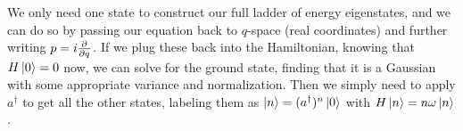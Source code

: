 We only need one state to construct our full ladder of energy eigenstates, and we can do so by passing our equation back to $q$-space (real coordinates) and further writing $p=i \P{}{q}$. If we plug these back into the Hamiltonian, knowing that $H\ket{0}=0$ now, we can solve for the ground state, finding that it is a Gaussian with some appropriate variance and normalization. Then we simply need to apply $a^\dagger$ to get all the other states, labeling them as $\ket{n}=(a^\dagger)^n \ket{0}$ with $H \ket{n}=n\omega \ket{n}$.